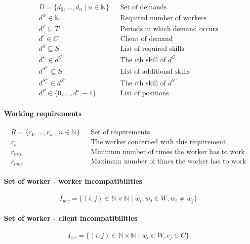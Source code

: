 \documentclass[../../thesis.tex]{subfiles}
\begin{document}
\begin{align*}
  D = \{ d_0, \dots, d_n \mid n \in \mathbb{N} \} && \text{Set of demands} \\
  d^w \in \mathbb{N} && \text{Required number of workers} \\ 
  d^T \subseteq T && \text{Periods in which demand occurs} \\ 
  d^c \in C && \text{Client of demand} \\ 
  d^S \subseteq S && \text{List of required skills} \\
  d^{s_i} \in d^S && \text{The $i$th skill of $d^S$} \\ 
  d^{S^+} \subseteq S && \text{List of additional skills} \\ 
  d^{S^+_i} \in d^{S^+} && \text{The $i$th skill of $d^{S^+}$} \\ 
  d^P \in \{ 0, \dots, d^w - 1 \} && \text{List of positions}
\end{align*}

\paragraph{Working requirements}

\begin{align*}
    R = \{ r_0, \dots, r_n \mid n \in \mathbb{N} \} && \text{Set of requirements} \\ 
    r_{w}   && \text{The worker concerned with this requirement} \\
    r_{min} && \text{Minimum number of times the worker has to work} \\
    r_{max} && \text{Maximum number of times the worker has to work}
\end{align*}


\paragraph{Set of worker - worker incompatibilities}

\begin{equation*}
    {I_{ww} = \{ ({i},{j}) \in \mathbb{N} \times \mathbb{N} \mid w_i, w_j \in W, w_i \neq w_j \}}
\end{equation*}


\paragraph{Set of worker - client incompatibilities}
\begin{equation*}
    I_{wc} = \{ (i, j) \in \mathbb{N} \times \mathbb{N} \mid w_i \in W, c_j \in C \}
\end{equation*}
\end{document}
